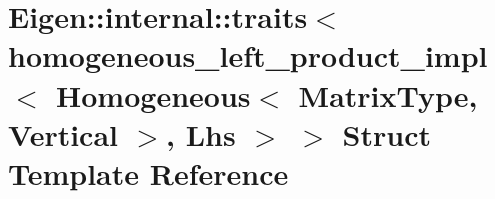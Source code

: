 \hypertarget{struct_eigen_1_1internal_1_1traits_3_01homogeneous__left__product__impl_3_01_homogeneous_3_01_ma5f6080eece96c58f7d2ccea57ec7242b}{}\section{Eigen\+:\+:internal\+:\+:traits$<$ homogeneous\+\_\+left\+\_\+product\+\_\+impl$<$ Homogeneous$<$ Matrix\+Type, Vertical $>$, Lhs $>$ $>$ Struct Template Reference}
\label{struct_eigen_1_1internal_1_1traits_3_01homogeneous__left__product__impl_3_01_homogeneous_3_01_ma5f6080eece96c58f7d2ccea57ec7242b}
